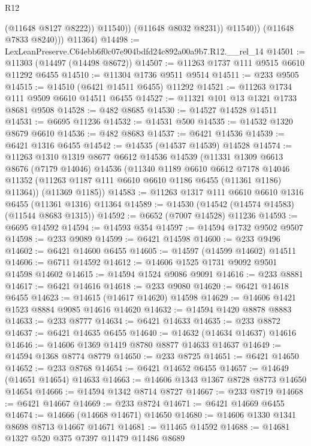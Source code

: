 \begin{lexlean}{R12}
\begin{coremodule}
                      (@11648 @8127 @8222))
                    @11540))
                (@11648 @8032 @8231))
              @11540))
          (@11648 @7833 @8240)))
      @11364)
@14498 := LexLeanPreserve.C64ebb6f0c07e904bdfd24c892a00a9b7.R12.__rel_14
@14501 := @11303 (@14497 (@14498 @8672))
@14507 := @11263 @1737 @111 @9515 @6610 @11292 @6455
@14510 := @11304 @1736 @9511 @9514
@14511 := @233 @9505
@14515 := @14510 (@6421 @14511 @6455) @11292
@14521 := @11263 @1734 @111 @9509 @6610 @14511 @6455
@14527 := @11321 @101 @13 @1321 @1733 @8681 @9508
@14528 := @482 @8685
@14530 := @14527 @14528 @14511
@14531 := @6695 @11236
@14532 := @14531 @500
@14535 := @14532 @1320 @8679 @6610
@14536 := @482 @8683
@14537 := @6421 @14536
@14539 := @6421 @1316 @6455
@14542 := @14535 (@14537 @14539) @14528
@14574 := @11263
    @1310
    @1319
    @8677
    @6612
    @14536
    @14539
    (@11331
      @1309
      @6613
      @8676
      (@7179 @14046)
      @14536
      (@11340
        @1189
        @6610
        @6612
        @7178
        @14046
        @11352
        (@11263 @1187 @111 @6610 @6610 @1186 @6455 (@11361 @1186) @11364))
      (@11369 @1185))
@14583 := @11263 @1317 @111 @6610 @6610 @1316 @6455 (@11361 @1316) @11364
@14589 := @14530 (@14542 (@14574 @14583) (@11544 @8683 @1315))
@14592 := @6652 (@7007 @14528) @11236
@14593 := @6695 @14592
@14594 := @14593 @354
@14597 := @14594 @1732 @9502 @9507
@14598 := @233 @9089
@14599 := @6421 @14598
@14600 := @233 @9496
@14602 := @6421 @14600 @6455
@14605 := @14597 (@14599 @14602) @14511
@14606 := @6711 @14592
@14612 := @14606 @1525 @1731 @9092 @9501 @14598 @14602
@14615 := @14594 @1524 @9086 @9091
@14616 := @233 @8881
@14617 := @6421 @14616
@14618 := @233 @9080
@14620 := @6421 @14618 @6455
@14623 := @14615 (@14617 @14620) @14598
@14629 := @14606 @1421 @1523 @8884 @9085 @14616 @14620
@14632 := @14594 @1420 @8878 @8883
@14633 := @233 @8777
@14634 := @6421 @14633
@14635 := @233 @8872
@14637 := @6421 @14635 @6455
@14640 := @14632 (@14634 @14637) @14616
@14646 := @14606 @1369 @1419 @8780 @8877 @14633 @14637
@14649 := @14594 @1368 @8774 @8779
@14650 := @233 @8725
@14651 := @6421 @14650
@14652 := @233 @8768
@14654 := @6421 @14652 @6455
@14657 := @14649 (@14651 @14654) @14633
@14663 := @14606 @1343 @1367 @8728 @8773 @14650 @14654
@14666 := @14594 @1342 @8714 @8727
@14667 := @233 @8719
@14668 := @6421 @14667
@14669 := @233 @8724
@14671 := @6421 @14669 @6455
@14674 := @14666 (@14668 @14671) @14650
@14680 := @14606 @1330 @1341 @8698 @8713 @14667 @14671
@14681 := @11465 @14592
@14688 := @14681 @1327 @520 @375 @7397 @11479 @11486 @8689

\end{coremodule}
\end{lexlean}

